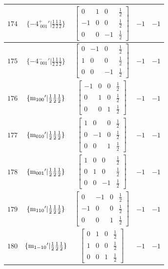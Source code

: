 \documentclass[fleqn,8pt]{jsarticle}
\begin{document}
\begin{longtable}{ccccc}
$ 174 $ & $ \{-4^{+}_{\,\,001}{}'|\frac{1}{2} \frac{1}{2} \frac{1}{2}\} $ & $ \begin{bmatrix} 0 & 1 & 0 & \frac{1}{2} \\ -1 & 0 & 0 & \frac{1}{2} \\ 0 & 0 & -1 & \frac{1}{2} \end{bmatrix} $ & $ -1 $ & $ -1 $ \\ \hline
$ 175 $ & $ \{-4^{-}_{\,\,001}{}'|\frac{1}{2} \frac{1}{2} \frac{1}{2}\} $ & $ \begin{bmatrix} 0 & -1 & 0 & \frac{1}{2} \\ 1 & 0 & 0 & \frac{1}{2} \\ 0 & 0 & -1 & \frac{1}{2} \end{bmatrix} $ & $ -1 $ & $ -1 $ \\ \hline
$ 176 $ & $ \{{\rm m}_{100}{}'|\frac{1}{2} \frac{1}{2} \frac{1}{2}\} $ & $ \begin{bmatrix} -1 & 0 & 0 & \frac{1}{2} \\ 0 & 1 & 0 & \frac{1}{2} \\ 0 & 0 & 1 & \frac{1}{2} \end{bmatrix} $ & $ -1 $ & $ -1 $ \\ \hline
$ 177 $ & $ \{{\rm m}_{010}{}'|\frac{1}{2} \frac{1}{2} \frac{1}{2}\} $ & $ \begin{bmatrix} 1 & 0 & 0 & \frac{1}{2} \\ 0 & -1 & 0 & \frac{1}{2} \\ 0 & 0 & 1 & \frac{1}{2} \end{bmatrix} $ & $ -1 $ & $ -1 $ \\ \hline
$ 178 $ & $ \{{\rm m}_{001}{}'|\frac{1}{2} \frac{1}{2} \frac{1}{2}\} $ & $ \begin{bmatrix} 1 & 0 & 0 & \frac{1}{2} \\ 0 & 1 & 0 & \frac{1}{2} \\ 0 & 0 & -1 & \frac{1}{2} \end{bmatrix} $ & $ -1 $ & $ -1 $ \\ \hline
$ 179 $ & $ \{{\rm m}_{110}{}'|\frac{1}{2} \frac{1}{2} \frac{1}{2}\} $ & $ \begin{bmatrix} 0 & -1 & 0 & \frac{1}{2} \\ -1 & 0 & 0 & \frac{1}{2} \\ 0 & 0 & 1 & \frac{1}{2} \end{bmatrix} $ & $ -1 $ & $ -1 $ \\ \hline
$ 180 $ & $ \{{\rm m}_{1-10}{}'|\frac{1}{2} \frac{1}{2} \frac{1}{2}\} $ & $ \begin{bmatrix} 0 & 1 & 0 & \frac{1}{2} \\ 1 & 0 & 0 & \frac{1}{2} \\ 0 & 0 & 1 & \frac{1}{2} \end{bmatrix} $ & $ -1 $ & $ -1 $ \\ \hline

\end{longtable}
\end{document}
